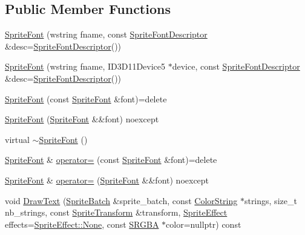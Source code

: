 \subsection*{Public Member Functions}
\begin{DoxyCompactItemize}
\item 
\hyperlink{classmage_1_1_sprite_font_a14069bfb14980107c74407182e591927}{Sprite\+Font} (wstring fname, const \hyperlink{classmage_1_1_sprite_font_descriptor}{Sprite\+Font\+Descriptor} \&desc=\hyperlink{classmage_1_1_sprite_font_descriptor}{Sprite\+Font\+Descriptor}())
\item 
\hyperlink{classmage_1_1_sprite_font_ae710e178a60b9b681f0471179bbb2581}{Sprite\+Font} (wstring fname, I\+D3\+D11\+Device5 $\ast$device, const \hyperlink{classmage_1_1_sprite_font_descriptor}{Sprite\+Font\+Descriptor} \&desc=\hyperlink{classmage_1_1_sprite_font_descriptor}{Sprite\+Font\+Descriptor}())
\item 
\hyperlink{classmage_1_1_sprite_font_a5df751fe06abda25127fdd9222e41948}{Sprite\+Font} (const \hyperlink{classmage_1_1_sprite_font}{Sprite\+Font} \&font)=delete
\item 
\hyperlink{classmage_1_1_sprite_font_a5967030bbb60c1927c097cabdb6ab372}{Sprite\+Font} (\hyperlink{classmage_1_1_sprite_font}{Sprite\+Font} \&\&font) noexcept
\item 
virtual \hyperlink{classmage_1_1_sprite_font_acbf50687b4a5dbb2ff1ad73ecc89b7f1}{$\sim$\+Sprite\+Font} ()
\item 
\hyperlink{classmage_1_1_sprite_font}{Sprite\+Font} \& \hyperlink{classmage_1_1_sprite_font_a3f95359a336adc87088eefe3103a770b}{operator=} (const \hyperlink{classmage_1_1_sprite_font}{Sprite\+Font} \&font)=delete
\item 
\hyperlink{classmage_1_1_sprite_font}{Sprite\+Font} \& \hyperlink{classmage_1_1_sprite_font_a02aa513f2f9947d8eabe1d250a4c42c0}{operator=} (\hyperlink{classmage_1_1_sprite_font}{Sprite\+Font} \&\&font) noexcept
\item 
void \hyperlink{classmage_1_1_sprite_font_a4d919aa90bc5ffe084c2d662297d03c4}{Draw\+Text} (\hyperlink{classmage_1_1_sprite_batch}{Sprite\+Batch} \&sprite\+\_\+batch, const \hyperlink{classmage_1_1_color_string}{Color\+String} $\ast$strings, size\+\_\+t nb\+\_\+strings, const \hyperlink{classmage_1_1_sprite_transform}{Sprite\+Transform} \&transform, \hyperlink{namespacemage_ad62ebdf0e7aae0caf1535a4ea3f056ea}{Sprite\+Effect} effects=\hyperlink{namespacemage_ad62ebdf0e7aae0caf1535a4ea3f056eaa6adf97f83acf6453d4a6a4b1070f3754}{Sprite\+Effect\+::\+None}, const \hyperlink{structmage_1_1_s_r_g_b_a}{S\+R\+G\+BA} $\ast$color=nullptr) const

\end{DoxyCompactItemize}

